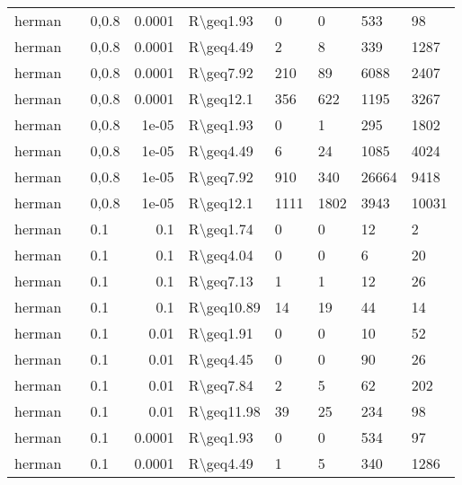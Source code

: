 \begin{longtable}{lllrlllll}
 herman        &           & 0,0.8 & 0.0001 & R\textbackslash{}geq1.93  & 0    & 0    & 533      & 98      \\
 herman        &           & 0,0.8 & 0.0001 & R\textbackslash{}geq4.49  & 2    & 8    & 339      & 1287    \\
 herman        &           & 0,0.8 & 0.0001 & R\textbackslash{}geq7.92  & 210  & 89   & 6088     & 2407    \\
 herman        &           & 0,0.8 & 0.0001 & R\textbackslash{}geq12.1  & 356  & 622  & 1195     & 3267    \\
 herman        &           & 0,0.8 & 1e-05  & R\textbackslash{}geq1.93  & 0    & 1    & 295      & 1802    \\
 herman        &           & 0,0.8 & 1e-05  & R\textbackslash{}geq4.49  & 6    & 24   & 1085     & 4024    \\
 herman        &           & 0,0.8 & 1e-05  & R\textbackslash{}geq7.92  & 910  & 340  & 26664    & 9418    \\
 herman        &           & 0,0.8 & 1e-05  & R\textbackslash{}geq12.1  & 1111 & 1802 & 3943     & 10031   \\
 herman        &           & 0.1   & 0.1    & R\textbackslash{}geq1.74  & 0    & 0    & 12       & 2       \\
 herman        &           & 0.1   & 0.1    & R\textbackslash{}geq4.04  & 0    & 0    & 6        & 20      \\
 herman        &           & 0.1   & 0.1    & R\textbackslash{}geq7.13  & 1    & 1    & 12       & 26      \\
 herman        &           & 0.1   & 0.1    & R\textbackslash{}geq10.89 & 14   & 19   & 44       & 14      \\
 herman        &           & 0.1   & 0.01   & R\textbackslash{}geq1.91  & 0    & 0    & 10       & 52      \\
 herman        &           & 0.1   & 0.01   & R\textbackslash{}geq4.45  & 0    & 0    & 90       & 26      \\
 herman        &           & 0.1   & 0.01   & R\textbackslash{}geq7.84  & 2    & 5    & 62       & 202     \\
 herman        &           & 0.1   & 0.01   & R\textbackslash{}geq11.98 & 39   & 25   & 234      & 98      \\
 herman        &           & 0.1   & 0.0001 & R\textbackslash{}geq1.93  & 0    & 0    & 534      & 97      \\
 herman        &           & 0.1   & 0.0001 & R\textbackslash{}geq4.49  & 1    & 5    & 340      & 1286    \\

\end{longtable}
